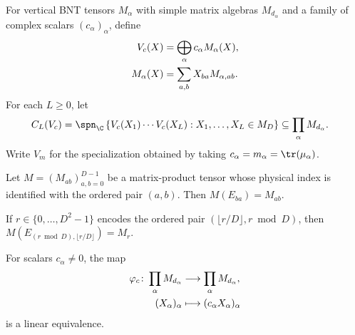 \begin{definition}
    \label{def:mpdo_weighted_vertical_contraction_products}
    \leanok
    For vertical BNT tensors $M_\alpha$ with simple matrix algebras
    $M_{d_\alpha}$ and a family of complex scalars $(c_\alpha)_\alpha$, define
    \begin{align}
        V_c(X)
         & =\bigoplus_\alpha c_\alpha M_\alpha(X),
        \notag                                     \\
        M_\alpha(X)
         & =\sum_{a,b}X_{ba}M_{\alpha,ab}.
        \notag
    \end{align}
    For each $L\geq0$, let
    \begin{align}
        C_L(V_c)
         & =\spn_{\C}\left\{V_c(X_1)\cdots V_c(X_L):
        X_1,\ldots,X_L\in M_D\right\}
        \subseteq \prod_\alpha M_{d_\alpha}.
        \notag
    \end{align}
    Write $V_m$ for the specialization obtained by taking
    $c_\alpha=m_\alpha=\tr(\mu_\alpha)$.
\end{definition}

\begin{lemma}
    \label{lem:mpdo_vertical_bond_contraction_matrix_unit}
    \leanok
    Let $M=(M_{ab})_{a,b=0}^{D-1}$ be a matrix-product tensor whose physical
    index is identified with the ordered pair $(a,b)$. Then
    $M(E_{ba})=M_{ab}$.
\end{lemma}

\begin{lemma}
    \label{lem:mpdo_vertical_bond_contraction_encoded_matrix_unit}
    \leanok
    If $r\in\{0,\ldots,D^2-1\}$ encodes the ordered pair
    $(\lfloor r/D\rfloor,r\bmod D)$, then
    $M\!\left(E_{(r\bmod D),\lfloor r/D\rfloor}\right)=M_r$.
\end{lemma}

\begin{definition}
    \label{def:mpdo_vertical_sector_scaling_equivalence}
    \leanok
    For scalars $c_\alpha\ne0$, the map
    \begin{align}
        \varphi_c\colon\prod_\alpha M_{d_\alpha}
         & \longrightarrow\prod_\alpha M_{d_\alpha},
        \notag                                       \\
        (X_\alpha)_\alpha
         & \longmapsto(c_\alpha X_\alpha)_\alpha
        \notag
    \end{align}
    is a linear equivalence.
\end{definition}

